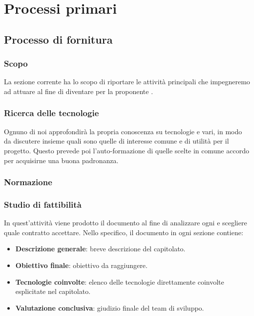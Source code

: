 \section{Processi primari}\label{ProcessiPrimari}

    \subsection{Processo di fornitura}\label{PP:Fornitura}	%

        \subsubsection{Scopo}\label{PP:Fornitura:Scopo}
		La sezione corrente ha lo scopo di riportare le attività principali che impegneremo ad attuare al fine di
		diventare  per la proponente \II.

		\subsubsection{Ricerca delle tecnologie}
		Ognuno di noi approfondirà la propria conoscenza su tecnologie e  vari, in modo da discutere insieme quali sono
		quelle di interesse comune e di utilità per il progetto. Questo prevede poi l'auto-formazione di quelle scelte in comune accordo
		per acquisirne una buona padronanza.

		\subsubsection{Normazione} %

        \subsubsection{Studio di fattibilità}\label{PP:Fornitura:SdF}
        In quest'attività viene prodotto il documento \Doc{\SdFv} al fine di analizzare ogni  e scegliere quale contratto accettare.
        Nello specifico, il documento in ogni sezione contiene:
        	\begin{itemize}
        		\item \textbf{Descrizione generale}: breve descrizione del capitolato.
        		\item \textbf{Obiettivo finale}: obiettivo da raggiungere.
        		\item \textbf{Tecnologie coinvolte}: elenco delle tecnologie direttamente coinvolte esplicitate nel capitolato.
        		\item \textbf{Valutazione conclusiva}: giudizio finale del team di sviluppo.
        	\end{itemize}

